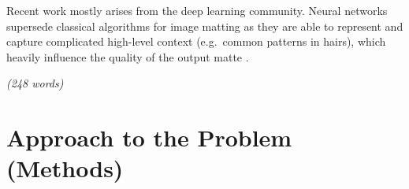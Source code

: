 \documentclass{article}
\begin{document}
Recent work mostly arises from the deep learning community. Neural networks supersede classical algorithms for image matting as they are able to  represent and capture complicated high-level context (e.g.\ common patterns in hairs), which heavily influence the quality of the output matte \cite{sota-composition-1k}.

\emph{(248 words)}

%
























\section{Approach to the Problem (Methods)}
\end{document}
